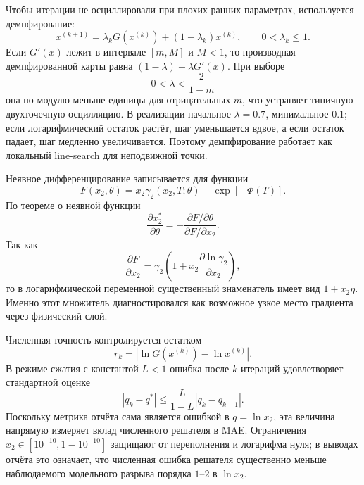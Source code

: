 \documentclass[11pt]{article}
\theoremstyle{definition}
\begin{document}
Чтобы итерации не осциллировали при плохих ранних параметрах, используется демпфирование:
\begin{equation*}
    x^{(k+1)}
    =\lambda_k G(x^{(k)})+(1-\lambda_k)x^{(k)},
    \qquad 0<\lambda_k\leq 1.
\end{equation*}
Если $G'(x)$ лежит в интервале $[m,M]$ и $M<1$, то производная демпфированной карты равна
$(1-\lambda)+\lambda G'(x)$. При выборе
\begin{equation*}
    0<\lambda<\frac{2}{1-m}
\end{equation*}
она по модулю меньше единицы для отрицательных $m$, что устраняет типичную двухточечную осцилляцию. В реализации начальное $\lambda=0.7$, минимальное $0.1$; если логарифмический остаток растёт, шаг уменьшается вдвое, а если остаток падает, шаг медленно увеличивается. Поэтому демпфирование работает как локальный line-search для неподвижной точки.

Неявное дифференцирование записывается для функции
\begin{equation*}
    F(x_2,\theta)=x_2\gamma_2(x_2,T;\theta)-\exp[-\Phi(T)] .
\end{equation*}
По теореме о неявной функции
\begin{equation*}
    \frac{\partial x_2^*}{\partial\theta}
    =-
    \frac{\partial F/\partial\theta}{\partial F/\partial x_2}.
\end{equation*}
Так как
\begin{equation*}
    \frac{\partial F}{\partial x_2}
    =\gamma_2\left(1+x_2\frac{\partial\ln\gamma_2}{\partial x_2}\right),
\end{equation*}
то в логарифмической переменной существенный знаменатель имеет вид
$1+x_2\eta$. Именно этот множитель диагностировался как возможное узкое место градиента через физический слой.

Численная точность контролируется остатком
\begin{equation*}
    r_k=|\ln G(x^{(k)})-\ln x^{(k)}|.
\end{equation*}
В режиме сжатия с константой $L<1$ ошибка после $k$ итераций удовлетворяет стандартной оценке
\begin{equation*}
    |q_k-q^*|\leq \frac{L}{1-L}|q_k-q_{k-1}|.
\end{equation*}
Поскольку метрика отчёта сама является ошибкой в $q=\ln x_2$, эта величина напрямую измеряет вклад численного решателя в MAE. Ограничения $x_2\in[10^{-10},1-10^{-10}]$ защищают от переполнения и логарифма нуля; в выводах отчёта это означает, что численная ошибка решателя существенно меньше наблюдаемого модельного разрыва порядка $1$--$2$ в $\ln x_2$.
\end{document}

